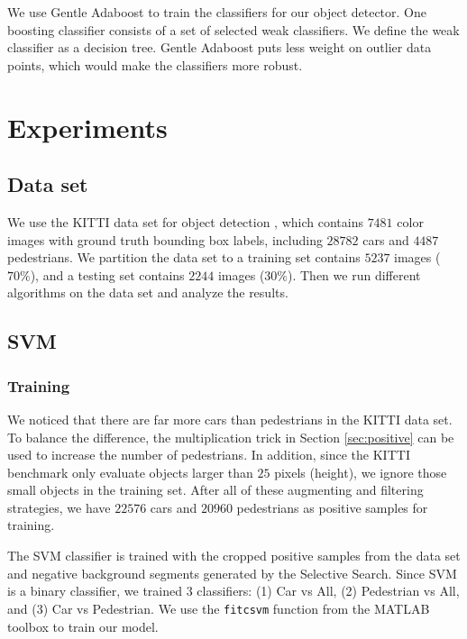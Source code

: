 \documentclass{article} %
\begin{document}
We use Gentle Adaboost \cite{Torralba04sharingfeatures:} to train the classifiers for our object detector. One boosting classifier consists of a set of selected weak classifiers. We define the weak classifier as a decision tree. Gentle Adaboost puts less weight on outlier data points, which would make the classifiers more robust.

\section{Experiments}

\subsection{Data set}

We use the KITTI data set for object detection \cite{Geiger2012CVPR}, which contains $7481$ color images with ground truth bounding box labels, including $28782$ cars and $4487$ pedestrians. We partition the data set to a training set contains $5237$ images ($70\%$), and a testing set contains $2244$ images ($30\%$). Then we run different algorithms on the data set and analyze the results.

\subsection{SVM}

\subsubsection{Training}

We noticed that there are far more cars than pedestrians in the KITTI data set. To balance the difference, the multiplication trick in Section \ref{sec:positive} can be used to increase the number of pedestrians. In addition, since the KITTI benchmark only evaluate objects larger than $25$ pixels (height), we ignore those small objects in the training set. After all of these augmenting and filtering strategies, we have $22576$ cars and $20960$ pedestrians as positive samples for training.

The SVM classifier is trained with the cropped positive samples from the data set and negative background segments generated by the Selective Search. Since SVM is a binary classifier, we trained 3 classifiers: (1) Car vs All, (2) Pedestrian vs All, and (3) Car vs Pedestrian. We use the \texttt{fitcsvm} function from the MATLAB toolbox to train our model.
\end{document}

